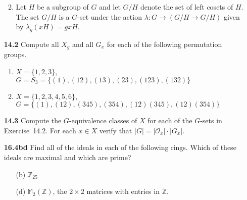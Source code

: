 \documentclass[12pt,reqno]{amsart}
\newcommand{\Z}{\ensuremath{\mathbb{Z}}}
\newcommand{\<}{\ensuremath{\langle}}
\renewcommand{\>}{\ensuremath{\rangle}}
\newcommand{\probskip}{\vskip1cm}
\begin{document}
\begin{enumerate}
\begin{enumerate}
\smallskip 

 
\item
Let $H$ be a subgroup of $G$ and let $G/H$ denote the set of left cosets
of $H$.  The set $G/H$ is a $G$-set under the action
$\lambda: G \rightarrow (G/H \rightarrow G/H)$ given by 
$\lambda_g(xH) = gxH$.%
\end{enumerate}

\probskip

\item[{\bf 14.2}] \label{actions}
Compute all $X_g$ and all $G_x$ for each of the following permutation
groups. 
\begin{enumerate}
 \item
$X= \{1, 2, 3\}$, \\
$G=S_3=\{(1), (12), (13), (23), (123), (132)  \}$
 
 \item
$X = \{1, 2, 3, 4, 5, 6\}$, \\
$G = \{(1), (12), (345), (354), (12)(345), (12)(354)  \}$
\end{enumerate}
 
\probskip
 
\item[{\bf 14.3}]
Compute the $G$-equivalence classes of $X$ for each of the $G$-sets in
Exercise~14.2. For each $x \in X$ verify that 
$|G|=|{\mathcal O}_x| \cdot |G_x|$.  
\probskip

\probskip

% 
% 
% 
% 

\item[{\bf 16.4bd}] Find all of the ideals in each of the following rings. Which of these ideals are maximal
and which are prime?
\begin{enumerate}
  \item [(b)] $\Z_{25}$
\item [(d)] $\mathbb{M}_2(\Z)$, the $2 \times 2$ matrices with entries in $\mathbb Z$.
\end{enumerate}


\end{enumerate}
\end{document}
